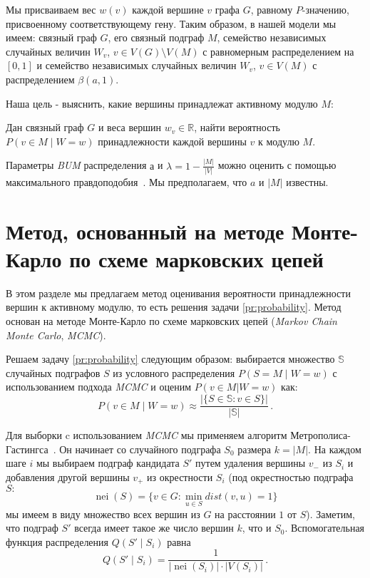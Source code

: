 Мы присваиваем вес $w(v)$ каждой вершине $v$ графа $G$, равному $P$-значению,
присвоенному соответствующему гену.  Таким образом, в нашей модели мы имеем:
связный граф $G$, его связный подграф $M$, семейство независимых случайных
величин $W_v$, $v \in V (G) \setminus V(M)$ с равномерным распределением на
$[0, 1]$ и семейство независимых случайных величин $W_v$, $v \in V (M)$
с распределением $\beta(a, 1)$.

Наша цель - выяснить, какие вершины принадлежат активному модулю $M$:
\begin{problem}
    Дан связный граф $G$ и веса вершин $w_v \in \mathbb{R}$, найти вероятность
    $P(v \in M \mid W = w)$ принадлежности каждой вершины $v$ к модулю $M$.
    \label{pr:probability}
\end{problem}

Параметры \emph{BUM} распределения $а$ и $\lambda = 1 - \frac{|M|}{|V|}$
можно оценить с помощью максимального правдоподобия~\cite{Beisser2010}.
Мы предполагаем, что $a$ и $|M|$ известны.





\section{Метод, основанный на методе Монте-Карло по схеме марковских цепей}

В этом разделе мы предлагаем метод оценивания вероятности принадлежности вершин
к активному модулю, то есть решения задачи \ref{pr:probability}.  Метод основан
на методе Монте-Карло по схеме марковских цепей (\emph{Markov Chain Monte
Carlo}, \emph{MCMC}).

Решаем задачу \ref{pr:probability} следующим образом: выбирается множество
$\mathbb{S}$ случайных подграфов $S$ из условного распределения $P(S = M \mid
W = w)$ с использованием подхода \emph{MCMC} и оценим $P(v \in M|W = w)$ как:
\[P(v \in M \mid W = w) \approx \frac{|\{S \in \mathbb{S} : v \in
S\}|}{|\mathbb{S}|} \, .\]

Для выборки c использованием \emph{MCMC} мы применяем алгоритм
Метрополиса-Гастингса~\cite{Hastings1970}.  Он начинает со случайного подграфа
$S_0$ размера $k=|M|$. На каждом шаге $i$ мы выбираем подграф кандидата $S'$
путем удаления вершины $v_-$ из $S_i$ и добавления другой вершины $v_+$ из
окрестности $S_i$ (под окрестностью подграфа $S:$
\[\operatorname{nei}(S) = \{v \in G: \min_{u \in S} dist(v,u) =1\}\]
мы имеем в виду множество всех вершин из $G$ на расстоянии $1$ от $S$).
Заметим, что подграф $S'$ всегда имеет такое же число вершин $k$, что и $S_0$.
Вспомогательная функция распределения $Q(S' \mid S_i)$ равна
\[Q(S' \mid S_i) = \frac{1}{|\operatorname{nei}(S_{i})| \cdot |V(S_i)|} \, .\]


